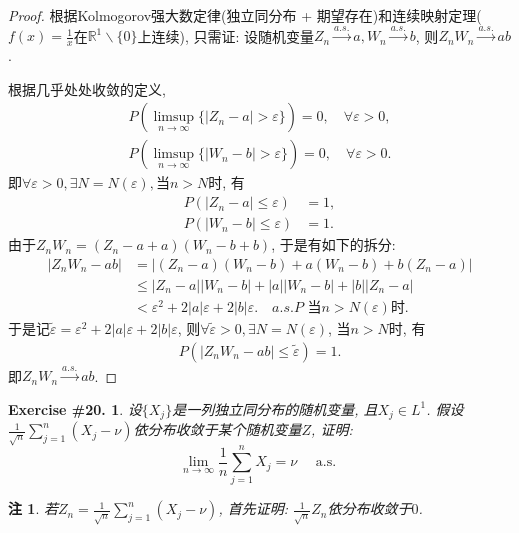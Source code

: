 \documentclass[UTF8, a4paper]{article}
\newtheorem{exercise}{Exercise \#20.}
\newtheorem*{remark}{注}
\begin{document}
\begin{proof}
根据Kolmogorov强大数定律(独立同分布 + 期望存在)和连续映射定理(\(f(x) = \frac{1}{x}\)在\(\mathbb{R}^1\backslash \{0\}\)上连续), 只需证:
设随机变量\(Z_n \xrightarrow{a.s.} a, W_n \xrightarrow{a.s.} b\), 则\(Z_nW_n \xrightarrow{a.s.} ab\).


根据几乎处处收敛的定义, 
$$
\begin{aligned}
    P(\limsup_{n\to\infty}\{|Z_n - a| > \varepsilon\}) = 0, \quad \forall \varepsilon > 0, \\
    P(\limsup_{n\to\infty}\{|W_n - b| > \varepsilon\}) = 0, \quad \forall \varepsilon > 0.
\end{aligned}
$$
即\(\forall \varepsilon > 0, \exists N  = N(\varepsilon),\)当\(n > N\)时, 有
\begin{align*}
    P\left(\left|Z_n - a\right| \leq \varepsilon\right) & = 1, \\
    P\left(\left|W_n - b\right| \leq \varepsilon\right) & = 1.
\end{align*}
由于\(Z_nW_n = (Z_n - a + a)(W_n - b + b)\), 于是有如下的拆分: 
$$
\begin{aligned}
    \left|Z_nW_n - ab\right| & = \left|(Z_n - a)(W_n - b) + a(W_n - b) + b(Z_n - a)\right| \\
    & \leq \left|Z_n - a\right|\left|W_n - b\right| + \left|a\right|\left|W_n - b\right| + \left|b\right|\left|Z_n - a\right| \\
    & < \varepsilon^2 + 2\left|a\right|\varepsilon + 2\left|b\right|\varepsilon. \quad a.s. P \text{ 当} n > N(\varepsilon) \text{时.}
\end{aligned}
$$
于是记\(\tilde{\varepsilon} = \varepsilon^2 + 2\left|a\right|\varepsilon + 2\left|b\right|\varepsilon\), 
则\(\forall \tilde{\varepsilon} > 0, \exists N = N(\varepsilon)\), 当\(n > N\)时, 有
\begin{align*}
    P\left(\left|Z_nW_n - ab\right| \leq \tilde{\varepsilon}\right) = 1.
\end{align*}
即\(Z_nW_n \xrightarrow{a.s.} ab\).
\end{proof}

\begin{framed}
\begin{exercise}
设\(\{X_j\}\)是一列独立同分布的随机变量, 且\(X_j \in L^1\).
假设\(\frac{1}{\sqrt{n}} \sum_{j = 1}^{n}(X_j - \nu)\)依分布收敛于某个随机变量\(Z\), 证明:
$$
\lim _{n \rightarrow \infty} \frac{1}{n} \sum_{j=1}^n X_j=\nu \quad \text { a.s. }
$$
\end{exercise}
\end{framed}
\begin{remark}
若\(Z_n = \frac{1}{\sqrt{n}} \sum_{j = 1}^{n}(X_j - \nu)\), 
首先证明: \(\frac{1}{\sqrt{n}}Z_n\)依分布收敛于\(0\).
\end{remark}
\end{document}
